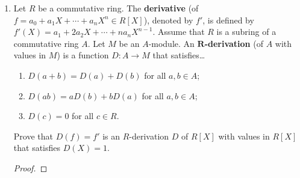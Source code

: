 \documentclass[../psets.tex]{subfiles}
\begin{document}
\begin{enumerate}
\begin{enumerate}
\begin{proof}
            The subring $S$ of the previous problem, rephrased in terms of this problem, is
            \begin{equation*}
                S = R_p = F[X]_{(X-a)}
            \end{equation*}
            Thus, to prove that $A+B=S$, it will suffice to show that $F[X]+F[(X-a)^{-1}]=F[X]_{(X-a)}$. We proceed once again via a bidirectional inclusion proof.\par
            Suppose first that $p/(X-a)^n\in F[X]_{(X-a)}$, where $n\in\N$. By the Euclidean algorithm for monic polynomials, we know that
            \begin{align*}
                p(X) &= q(X)\cdot(X-a)^n+r(X)\\
                \frac{p(X)}{(X-a)^n} &= q(X)+\frac{r(X)}{(X-a)^n}
            \end{align*}
            for some $q,r\in F[X]$ with $\deg(r)<n$. From here, we cam resolve $r(X)/(X-a)^n$ into a polynomial in $(X-a)^{-1}$ using the method of partial fractions. Therefore, as the sum of a term in $F[X]$ and a term in $F[(X-a)^{-1}]$, $p/(X-a)^n\in F[X]+F[(X-a)^{-1}]$, as desired.\par
            Now suppose that $p+q\in F[X]+F[(X-a)^{-1}]$. Add all terms together with least common denominator $(X-a)^n$, where $n$ is the degree of $f\in F[T]$ whose image under $\phi$ is $q$. This yields a rational function equal to $p+q$ in $F[X]_{(X-a)}$, as desired.
        \end{proof}
    \end{enumerate}
    \item Let $R$ be a commutative ring. The \textbf{derivative} (of $f=a_0+a_1X+\cdots+a_nX^n\in R[X]$), denoted by $f'$, is defined by $f'(X)=a_1+2a_2X+\cdots+na_nX^{n-1}$. Assume that $R$ is a subring of a commutative ring $A$. Let $M$ be an $A$-module. An \textbf{$\bm{R}$-derivation} (of $A$ with values in $M$) is a function $D:A\to M$ that satisfies\dots
    \begin{enumerate}[label={(\arabic*)}]
        \item $D(a+b)=D(a)+D(b)$ for all $a,b\in A$;
        \item $D(ab)=aD(b)+bD(a)$ for all $a,b\in A$;
        \item $D(c)=0$ for all $c\in R$.
    \end{enumerate}
    Prove that $D(f)=f'$ is an $R$-derivation $D$ of $R[X]$ with values in $R[X]$ that satisfies $D(X)=1$.
    \begin{proof}

\end{proof}
\end{enumerate}
\end{document}
